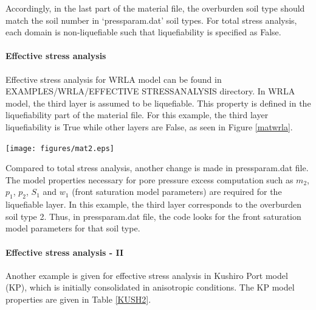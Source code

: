 Accordingly, in the last part of the material file, the overburden soil type should match the soil number in ‘pressparam.dat’ soil types. For total stress analysis, each domain is non-liquefiable such that liquefiability is specified as False. \\


\paragraph{Effective stress analysis}

Effective stress analysis for WRLA model can be found in EXAMPLES\slash WRLA\slash EFFECTIVE \textunderscore STRESS\textunderscore ANALYSIS directory. In WRLA model, the third layer is assumed to be liquefiable. This property is defined in the liquefiability part of the material file. For this example, the third layer liquefiability is True while other layers are False, as seen in Figure \ref{matwrla}. 


\begin{center}
\leavevmode
\texttt{[image: figures/mat2.eps]} 
\label{matwrla} 
\vspace{1cm}
\end{center}

Compared to total stress analysis, another change is made in pressparam.dat file. The model properties necessary for pore pressure excess computation such as $m_{2}$, $p_{1}$, $p_{2}$, $S_{1}$ and $w_{1}$ (front saturation model parameters) are required for the liquefiable layer. In this example, the third layer corresponds to the  overburden soil type 2. Thus, in pressparam.dat file, the code looks for the front saturation model parameters for that soil type. 

\paragraph{Effective stress analysis - II}

Another example is given for effective stress analysis in Kushiro Port model (KP), which is initially consolidated in anisotropic conditions. The KP model properties are given in Table \ref{KUSH2}. \\


